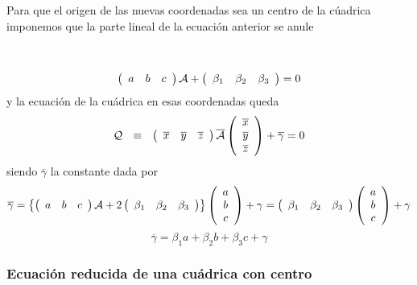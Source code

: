 \documentclass[11pt, a4paper, titlepage]{article}
\theoremstyle{theorem-style}
\theoremstyle{definition-style}
\theoremstyle{remark-style}
\theoremstyle{example-style}
\begin{document}
\vspace{.3cm}

Para que el origen de las nuevas coordenadas sea un centro de la c\'uadrica imponemos que la parte lineal de la ecuaci\'on anterior se anule

\

\[
{
\left( \begin{array}{ccc} 
a &  b &  c 
 \end{array} \right){\cal A}
+
 \left( \begin{array}{ccc}
\beta_1 & \beta_2 & \beta_3   
 \end{array} \right)
=0 }
\]
y la ecuaci\'on de la cu\'adrica en esas coordenadas queda
\[
{\cal Q} \, \, \, \, \equiv \, \, \, \,
\left(\begin{array}{ccc} 
\overline{x} & \overline{y} & \overline{z}   
 \end{array} \right){\overline{\cal A}}
\left(\begin{array}{c}
\overline{x} \\
\overline{y} \\
\overline{z}  
\end{array} \right) + \overline{\gamma} = 0
\]
siendo $\overline{\gamma}$ la constante dada por
\[
\overline{\gamma} = 
\left\{
\left( \begin{array}{ccc} 
a &  b &  c 
 \end{array} \right){\cal A}
+
 2\left( \begin{array}{ccc}
\beta_1 & \beta_2 & \beta_3   
 \end{array} \right)\right\}
\left( \begin{array}{c}
a \\
b \\
c  
 \end{array} \right)
+\gamma = 
\left( \begin{array}{ccc}
\beta_1 & \beta_2 & \beta_3   
 \end{array} \right)
\left( \begin{array}{c}
a \\
b \\
c  
 \end{array} \right)+\gamma
\]
\[
{ 
\overline{\gamma} =
\beta_1 a+ \beta_2 b+ \beta_3  c 
+\gamma
}
\]

\subsubsection{\bf Ecuaci\'on reducida de una cu\'adrica con centro}
\end{document}
